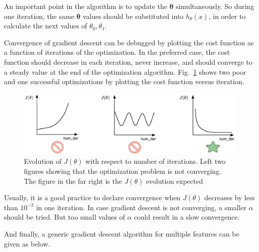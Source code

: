 An important point in the algorithm is to update the $\bm{\theta}$ simultaneously. 
So during one iteration, the same $\bm{\theta}$ values should be substituted into $h_\theta(x)$, in order to calculate the next values of $\theta_0, \theta_1$.
 
\iffalse
Convergence of gradient descent can be debugged by plotting the cost function as a function of iterations of the optimization.
In the preferred case, the cost function should decrease in each iteration, never increase, and should converge to a steady value at the end of the optimization algorithm. 
Fig.~\ref{fig:visualizeCostFunc} shows two poor and one successful optimizations by plotting the cost function versus iteration. 

\begin{figure}[hbt]
\begin{center}
\includegraphics[width=15cm]{figures/visualizeCostFunc}    %
\caption{Evolution of $J(\theta)$ with respect to number of iterations. Left two figures showing that the optimization problem is not converging. The figure in the far right is the $J(\theta)$ evolution expected} 
\label{fig:visualizeCostFunc}
\end{center}
\end{figure}

Usually, it is a good practice to declare convergence when $J(\theta)$ decreases by less than $10^{-3}$ in one iteration. 
In case gradient descent is not converging, a smaller $\alpha$ should be tried. 
But too small values of $\alpha$ could result in a slow convergence. 

And finally, a generic gradient descent algorithm for multiple features can be given as below.

